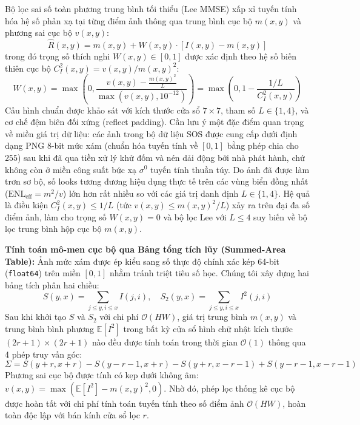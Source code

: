 Bộ lọc sai số toàn phương trung bình tối thiểu (Lee MMSE) xấp xỉ tuyến tính hóa hệ số phản xạ tại từng điểm ảnh thông qua trung bình cục bộ $m(x, y)$ và phương sai cục bộ $v(x, y)$:
\begin{equation}
\hat{R}(x, y) = m(x, y) + W(x, y) \cdot [I(x, y) - m(x, y)]
\label{eq:lee_formula}
\end{equation}
trong đó trọng số thích nghi $W(x, y) \in [0, 1]$ được xác định theo hệ số biến thiên cục bộ $C_I^2(x, y) = v(x, y) / m(x, y)^2$:
\begin{equation}
W(x, y) = \max\left(0, \frac{v(x, y) - \frac{m(x, y)^2}{L}}{\max(v(x, y), 10^{-12})}\right) = \max\left(0, 1 - \frac{1/L}{C_I^2(x, y)}\right)
\label{eq:lee_weight}
\end{equation}
Cấu hình chuẩn được khảo sát với kích thước cửa sổ $7 \times 7$, tham số $L \in \{1, 4\}$, và cơ chế đệm biên đối xứng (reflect padding). Cần lưu ý một đặc điểm quan trọng về miền giá trị dữ liệu: các ảnh trong bộ dữ liệu SOS được cung cấp dưới định dạng PNG 8-bit mức xám (chuẩn hóa tuyến tính về $[0, 1]$ bằng phép chia cho $255$) sau khi đã qua tiền xử lý khử đốm và nén dải động bởi nhà phát hành, chứ không còn ở miền công suất bức xạ $\sigma^0$ tuyến tính thuần túy. Do ảnh đã được làm trơn sơ bộ, số looks tương đương hiệu dụng thực tế trên các vùng biển đồng nhất ($\text{ENL}_{\text{eff}} = m^2 / v$) lớn hơn rất nhiều so với các giá trị danh định $L \in \{1, 4\}$. Hệ quả là điều kiện $C_I^2(x, y) \le 1/L$ (tức $v(x, y) \le m(x, y)^2/L$) xảy ra trên đại đa số điểm ảnh, làm cho trọng số $W(x, y) = 0$ và bộ lọc Lee với $L \le 4$ suy biến về bộ lọc trung bình hộp cục bộ $m(x, y)$.

\noindent\textbf{Tính toán mô-men cục bộ qua Bảng tổng tích lũy (Summed-Area Table):}
Ảnh mức xám được ép kiểu sang số thực độ chính xác kép 64-bit (\texttt{float64}) trên miền $[0, 1]$ nhằm tránh triệt tiêu số học. Chúng tôi xây dựng hai bảng tích phân hai chiều:
\begin{equation}
S(y, x) = \sum_{j \le y, i \le x} I(j, i), \quad S_2(y, x) = \sum_{j \le y, i \le x} I^2(j, i)
\end{equation}
Sau khi khởi tạo $S$ và $S_2$ với chi phí $\mathcal{O}(HW)$, giá trị trung bình $m(x, y)$ và trung bình bình phương $\mathbb{E}[I^2]$ trong bất kỳ cửa sổ hình chữ nhật kích thước $(2r+1) \times (2r+1)$ nào đều được tính toán trong thời gian $\mathcal{O}(1)$ thông qua 4 phép truy vấn góc:
\begin{equation}
\Sigma = S(y+r, x+r) - S(y-r-1, x+r) - S(y+r, x-r-1) + S(y-r-1, x-r-1)
\end{equation}
Phương sai cục bộ được tính có kẹp dưới không âm: $v(x, y) = \max(\mathbb{E}[I^2] - m(x, y)^2, 0)$. Nhờ đó, phép lọc thống kê cục bộ được hoàn tất với chi phí tính toán tuyến tính theo số điểm ảnh $\mathcal{O}(HW)$, hoàn toàn độc lập với bán kính cửa sổ lọc $r$.

